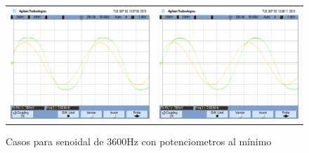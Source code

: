 \begin{figure}[H]
\begin{tabular}{c c}
        \includegraphics[scale=0.2]{../EJ5/Mediciones/Osciloscopio/Senoide_3600_Minimo/scope_11.png} & 
        \includegraphics[scale=0.2]{../EJ5/Mediciones/Osciloscopio/Senoide_3600_Minimo/scope_12.png} 
    \end{tabular}
    \caption{Casos para senoidal de 3600Hz con potenciometros al m\'inimo}
    \label{fig:senoide_3600_minimo}
\end{figure}

